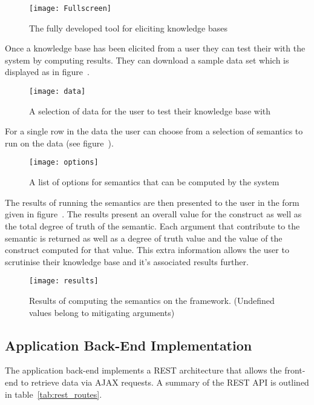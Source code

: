 \begin{figure}[!h]
\label{fig:finalUI}
\centering
\texttt{[image: Fullscreen]}
\caption{The fully developed tool for eliciting knowledge bases}
\end{figure}

Once a knowledge base has been elicited from a user they can test their with the system by computing results. They can download a sample data set which is displayed as in figure~\cite{fig:sampleData}.

\begin{figure}[!h]
\label{fig:sampleData}
\centering
\texttt{[image: data]}
\caption{A selection of data for the user to test their knowledge base with}
\end{figure}

For a single row in the data the user can choose from a selection of semantics to run on the data (see figure~\cite{fig:semantics}).

\begin{figure}[!h]
\label{fig:semantics}
\centering
\texttt{[image: options]}
\caption{A list of options for semantics that can be computed by the system}
\end{figure}

The results of running the semantics are then presented to the user in the form given in figure~\cite{fig:semantics_results}. The results present an overall value for the construct as well as the total degree of truth of the semantic. Each argument that contribute to the semantic is returned as well as a degree of truth value and the value of the construct computed for that value. This extra information allows the user to scrutinise their knowledge base and it's associated results further.

\begin{figure}[!h]
\label{fig:semantics_results}
\centering
\texttt{[image: results]}
\caption{Results of computing the semantics on the framework. (Undefined values belong to mitigating arguments)}
\end{figure}

\subsection{Application Back-End Implementation}

The application back-end implements a REST architecture that allows the front-end to retrieve data via AJAX requests. A summary of the REST API is outlined in table~\ref{tab:rest_routes}.

